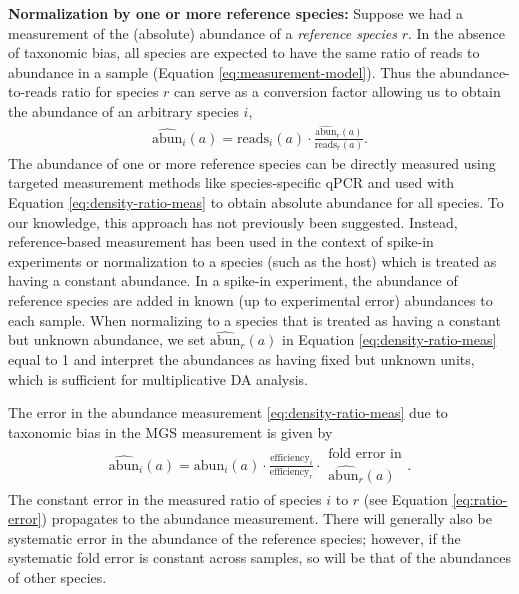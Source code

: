 \documentclass[
]{article}
\begin{document}
\textbf{Normalization by one or more reference species:}
Suppose we had a measurement of the (absolute) abundance of a \emph{reference species} \(r\).
In the absence of taxonomic bias, all species are expected to have the same ratio of reads to abundance in a sample (Equation \eqref{eq:measurement-model}).
Thus the abundance-to-reads ratio for species \(r\) can serve as a conversion factor allowing us to obtain the abundance of an arbitrary species \(i\),
\begin{align}
  \label{eq:density-ratio-meas}
  \widehat{\text{abun}}_{i}(a) = \text{reads}_{i}(a) \cdot \frac{\widehat{\text{abun}}_{r}(a)}{\text{reads}_{r}(a)}.
\end{align}
The abundance of one or more reference species can be directly measured using targeted measurement methods like species-specific qPCR and used with Equation
\eqref{eq:density-ratio-meas} to obtain absolute abundance for all species.
To our knowledge, this approach has not previously been suggested.
Instead, reference-based measurement has been used in the context of spike-in experiments or normalization to a species (such as the host) which is treated as having a constant abundance.
In a spike-in experiment, the abundance of reference species are added in known (up to experimental error) abundances to each sample.
When normalizing to a species that is treated as having a constant but unknown abundance, we set \(\widehat{\text{abun}}_{r}(a)\) in Equation \eqref{eq:density-ratio-meas} equal to 1 and interpret the abundances as having fixed but unknown units, which is sufficient for multiplicative DA analysis.

The error in the abundance measurement \eqref{eq:density-ratio-meas} due to taxonomic bias in the MGS measurement is given by
\begin{align}
  \label{eq:density-ratio-error}
  \widehat{\text{abun}}_{i}(a) 
  = \text{abun}_{i}(a) \cdot \frac{\text{efficiency}_{i}}{\text{efficiency}_{r}}
  \cdot \begin{array}{c} \text{fold error in} \\ \widehat{\text{abun}_r}(a) \end{array}.
\end{align}
The constant error in the measured ratio of species \(i\) to \(r\) (see Equation \eqref{eq:ratio-error}) propagates to the abundance measurement.
There will generally also be systematic error in the abundance of the reference species; however, if the systematic fold error is constant across samples, so will be that of the abundances of other species.
\end{document}
